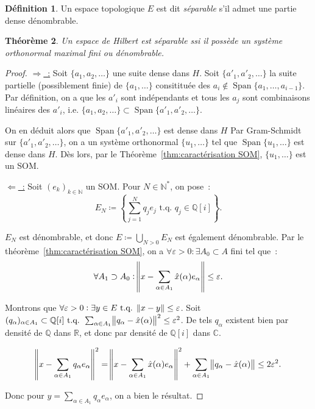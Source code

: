 \documentclass{report}
\DeclareMathOperator{\Span}{Span}
\newcommand{\C}{{\mathbb C}}
\newcommand{\R}{{\mathbb R}}
\newcommand{\Q}{{\mathbb Q}}
\newcommand{\N}{{\mathbb N}}
\newcommand{\tq}{\text{ t.q. }}
\newcommand{\st}{\tq}
\newtheorem{thm}{Théorème}[chapter]
\theoremstyle{definition}
\newtheorem{déf}[thm]{Définition}
\theoremstyle{remark}
\begin{document}
\begin{déf} Un espace topologique $E$ est dit \textit{séparable} s'il admet une partie dense dénombrable.
\end{déf}

\begin{thm} Un espace de Hilbert est séparable ssi il possède un système orthonormal maximal fini ou dénombrable.
\end{thm}

\begin{proof} \underline {$\Rightarrow$~:} Soit $\{a_1, a_2, \ldots\}$ une suite dense dans $H$. Soit $\{a'_1, a'_2, \ldots\}$ la suite partielle (possiblement finie) de
$\{a_1, \ldots\}$ consitituée des $a_i \not \in \Span\{a_1, \ldots, a_{i-1}\}$. Par définition, on a que les $a'_i$ sont indépendants et tous les $a_j$ sont combinaisons linéaires
des $a'_i$, i.e. $\{a_1, a_2, \ldots\} \subset \Span\{a'_1, a'_2, \ldots\}$.

On en déduit alors que $\Span\{a'_1, a'_2, \ldots\}$ est dense dans $H$ Par Gram-Schmidt sur $\{a'_1, a'_2, \ldots\}$, on a un système orthonormal $\{u_1, \ldots\}$ tel que
$\Span\{u_1, \ldots\}$ est dense dans $H$. Dès lors, par le Théorème~\ref{thm:caractérisation SOM}, $\{u_1, \ldots\}$ est un SOM.

\underline {$\Leftarrow$~:} Soit $(e_k)_{k \in \N}$ un SOM. Pour $N \in \N^*$, on pose~:
\[E_N \coloneqq \left\{\sum_{j=1}^Nq_je_j \tq q_j \in \Q[i]\right\}.\]

$E_N$ est dénombrable, et donc $E \coloneqq \bigcup_{N > 0}E_N$ est également dénombrable. Par le théorème~\ref{thm:caractérisation SOM}, on a
$\forall \varepsilon > 0 : \exists A_0 \subset A$ fini tel que~:
\[\forall A_1 \supset A_0 : \norm {x-\sum_{\alpha \in A_1}\hat x(\alpha)e_\alpha} \leq \varepsilon.\]

Montrons que $\forall \varepsilon > 0 : \exists y \in E \st \norm {x-y} \leq \varepsilon$.
Soit $(q_\alpha)_{\alpha \in A_1} \subset \Q[i] \st \sum_{\alpha \in A_1}\norm {q_\alpha - \hat x(\alpha)}^2 \leq \varepsilon^2$. De tels $q_\alpha$ existent bien par densité
de $\Q$ dans $\R$, et donc par densité de $\Q[i]$ dans $\C$.

\[\norm {x - \sum_{\alpha \in A_1}q_\alpha e_\alpha}^2 = \norm {x-\sum_{\alpha \in A_1}\hat x(\alpha)e_\alpha}^2 + \sum_{\alpha \in A_1}\norm {q_\alpha - \hat x(\alpha)} \leq 2\varepsilon^2.\]

Donc pour $y = \sum_{\alpha \in A_1}q_\alpha e_\alpha$, on a bien le résultat.
\end{proof}
\end{document}
